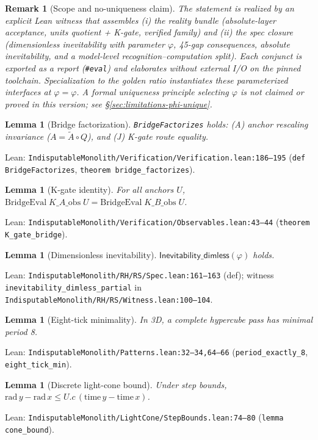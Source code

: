 \documentclass[11pt,a4paper,twoside]{article}
\numberwithin{equation}{section}
\newcommand{\phigr}{\varphi} %
\theoremstyle{customthm}
\newtheorem{lemma}[theorem]{Lemma}
\theoremstyle{customdef}
\theoremstyle{customrem}
\newtheorem{remark}[theorem]{Remark}
\begin{document}
\begin{remark}[Scope and no-uniqueness claim]
The statement is realized by an explicit Lean witness that assembles (i) the reality bundle (absolute-layer acceptance, units quotient + K-gate, verified family) and (ii) the spec closure (dimensionless inevitability with parameter $\varphi$, 45-gap consequences, absolute inevitability, and a model-level recognition–computation split). Each conjunct is exported as a report (\texttt{\#eval}) and elaborates without external I/O on the pinned toolchain. Specialization to the golden ratio instantiates these parameterized interfaces at $\varphi=\phigr$. A formal uniqueness principle selecting $\phigr$ is not claimed or proved in this version; see \S\ref{sec:limitations-phi-unique}.
\end{remark}

\begin{lemma}[Bridge factorization]\label{lem:factorizes}
\texttt{BridgeFactorizes} holds: (A) anchor rescaling invariance (\(A=\tilde A\circ Q\)), and (J) K-gate route equality.
\end{lemma}
\noindent Lean: \texttt{IndisputableMonolith/Verification/Verification.lean:186--195} (\texttt{def BridgeFactorizes}, \texttt{theorem bridge\_factorizes}).

\begin{lemma}[K-gate identity]\label{lem:kgate}
For all anchors $U$, \(\mathrm{BridgeEval}\;K\_A\_\mathrm{obs}\;U = \mathrm{BridgeEval}\;K\_B\_\mathrm{obs}\;U\).
\end{lemma}
\noindent Lean: \texttt{IndisputableMonolith/Verification/Observables.lean:43--44} (\texttt{theorem K\_gate\_bridge}).

\begin{lemma}[Dimensionless inevitability]\label{lem:inevitability}
\(\mathsf{Inevitability\_dimless}(\varphi)\) holds.
\end{lemma}
\noindent Lean: \texttt{IndisputableMonolith/RH/RS/Spec.lean:161--163} (def); witness \texttt{inevitability\_dimless\_partial} in \texttt{IndisputableMonolith/RH/RS/Witness.lean:100--104}.

\begin{lemma}[Eight-tick minimality]\label{lem:eight}
In 3D, a complete hypercube pass has minimal period 8.
\end{lemma}
\noindent Lean: \texttt{IndisputableMonolith/Patterns.lean:32--34,64--66} (\texttt{period\_exactly\_8}, \texttt{eight\_tick\_min}).

\begin{lemma}[Discrete light-cone bound]\label{lem:cone}
Under step bounds, \(\mathrm{rad}\,y - \mathrm{rad}\,x \le U.c\, (\mathrm{time}\,y - \mathrm{time}\,x)\).
\end{lemma}
\noindent Lean: \texttt{IndisputableMonolith/LightCone/StepBounds.lean:74--80} (\texttt{lemma cone\_bound}).
\end{document}
